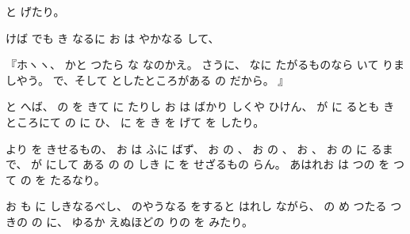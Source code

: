 と
げたり。

けば
でも
き
なるに
お
は
やかなる
して、

『ホヽヽ、
かと
つたら
な
なのかえ。
さうに、
なに
たがるものなら
いて
りましやう。
で、そして
としたところがある
の
だから。
』

と
へば、
の
を
きて
に
たりし
お
は
ばかり
しくや
ひけん、
が
に
るとも
きところにて
の
に
ひ、
に
を
き
を
げて
を
したり。

より
を
きせるもの、
お
は
ふに
ばず、
お
の
、
お
の
、
お
、
お
の
に
るまで、
が
にして
ある
の
の
しき
に
を
せざるもの
らん。
あはれお
は
つの
を
つて
の
を
たるなり。

お
も
に
しきなるべし、
のやうなる
をすると
はれし
ながら、
の
め
つたる
つきの
の
に、
ゆるか
えぬほどの
りの
を
みたり。


